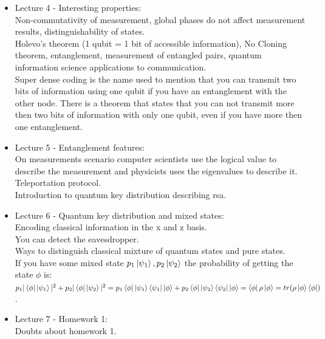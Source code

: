 \documentclass{article}
\begin{document}
\begin{itemize}
    \item {Lecture 4 - Interesting properties:}\\
    Non-commutativity of measurement, global phases do not affect measurement results, distinguishability of states.\\
    Holevo's theorem (1 qubit = 1 bit of accessible information), No Cloning theorem, entanglement, measurement of entangled pairs, quantum information science applications to communication.\\
    Super dense coding is the name used to mention that you can transmit two bits of information using one qubit if you have an entanglement with the other node. There is a theorem  that states that you can not transmit more then two bits of information with only one qubit, even if you have more then one entanglement.\\

    \item {Lecture 5 - Entanglement features:}\\
    On measurements scenario computer scientists use the logical value to describe the measurement and physicists uses the eigenvalues to describe it. \\
    Teleportation protocol. \\
    Introduction to quantum key distribution describing rsa.\\

    \item {Lecture 6 - Quantum key distribution and mixed states:}\\
    Encoding classical information in the x and z basis. \\
    You can detect the eavesdropper.\\
    Ways to distinguish classical mixture of quantum states and pure states.\\
    If you have some mixed state $p_1 \ket{\psi_1} , p_2 \ket{\psi_2}$ the probability of getting the state $\phi$ is: $p_1 |\bra{\phi}\ket{\psi_1}|^{2} + p_2 |\bra{\phi}\ket{\psi_2}|^{2} = p_1\bra{\phi}\ket{\psi_1}\bra{\psi_1}\ket{\phi} + p_2\bra{\phi}\ket{\psi_2}\bra{\psi_2}\ket{\phi} = \bra{\phi}\rho\ket{\phi} = tr(\rho \ket{\phi}\bra{\phi})$ .\\

    \item {Lecture 7 - Homework 1:}\\
    Doubts about homework 1.\\


\end{itemize}
\end{document}
